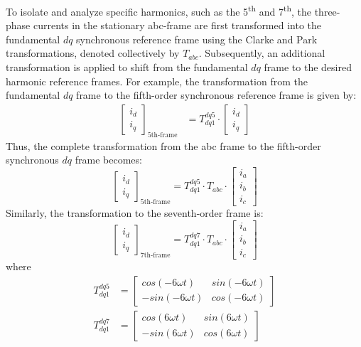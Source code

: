 To isolate and analyze specific harmonics, such as the 5\textsuperscript{th} and 7\textsuperscript{th}, the three-phase currents in the stationary abc-frame are first transformed into the fundamental $dq$ synchronous reference frame using the Clarke and Park transformations, denoted collectively by $T_{abc}$. Subsequently, an additional transformation is applied to shift from the fundamental $dq$ frame to the desired harmonic reference frames. For example, the transformation from the fundamental $dq$ frame to the fifth-order synchronous reference frame is given by:
\begin{align}
\begin{bmatrix}
i_d \\
i_q
\end{bmatrix}_{5\text{th-frame}}
&= T_{dq1}^{dq5} \cdot
\begin{bmatrix}
i_d \\
i_q
\end{bmatrix}
\end{align}
Thus, the complete transformation from the abc frame to the fifth-order synchronous $dq$ frame becomes:
\begin{equation}
\begin{bmatrix}
i_d \\
i_q
\end{bmatrix}_{5\text{th-frame}}
=
T_{dq1}^{dq5} \cdot T_{abc} \cdot
\begin{bmatrix}
i_a \\
i_b \\
i_c
\end{bmatrix}
\end{equation}
Similarly, the transformation to the seventh-order frame is:
\begin{equation}
\begin{bmatrix}
i_d \\
i_q
\end{bmatrix}_{7\text{th-frame}}
=
T_{dq1}^{dq7} \cdot T_{abc} \cdot
\begin{bmatrix}
i_a \\
i_b \\
i_c
\end{bmatrix}
\end{equation}
where
\begin{align}
T_{dq1}^{dq5}&=
\begin{bmatrix}
cos(-6\omega t)&sin(-6\omega t)\\
-sin(-6\omega t)&cos(-6\omega t)
\end{bmatrix}\\
T_{dq1}^{dq7}&=
\begin{bmatrix}
cos(6\omega t)&sin(6\omega t)\\
-sin(6\omega t)&cos(6\omega t)
\end{bmatrix}
\end{align}
